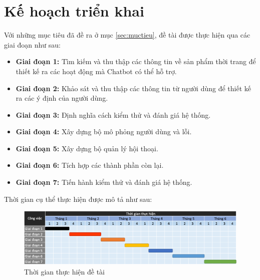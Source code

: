 \chapter {Kế hoạch triển khai}
Với những mục tiêu đã đề ra ở mục \ref{sec:muctieu}, đề tài được thực hiện qua các giai đoạn như sau:

\begin{itemize}
    \item \textbf{Giai đoạn 1:} Tìm kiếm và thu thập các thông tin về sản phẩm thời trang để thiết kế ra các hoạt động mà Chatbot có thể hỗ trợ.
    \item \textbf{Giai đoạn 2:} Khảo sát và thu thập các thông tin từ người dùng để thiết kế ra các ý định của người dùng.
    \item \textbf{Giai đoạn 3:} Định nghĩa cách kiểm thử và đánh giá hệ thống.
    \item \textbf{Giai đoạn 4:} Xây dựng bộ mô phỏng người dùng và lỗi.
    \item \textbf{Giai đoạn 5:} Xây dựng bộ quản lý hội thoại.
    \item \textbf{Giai đoạn 6:} Tích hợp các thành phần còn lại.
    \item \textbf{Giai đoạn 7:} Tiến hành kiểm thử và đánh giá hệ thống.
\end{itemize}

Thời gian cụ thể thực hiện được mô tả như sau:

\begin{center}
    \begin{figure}[h!]
        \begin{center}
         \includegraphics[scale=0.63]{chapter4.5/img/timeline.png}
        \end{center}
        \caption{Thời gian thực hiện đề tài}
    \end{figure}
\end{center}
